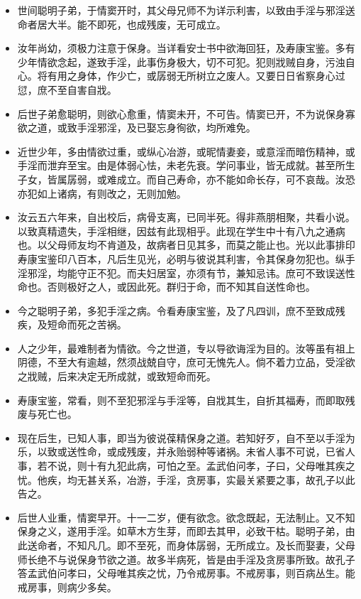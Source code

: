 \begin{itemize}\it
    \item 世间聪明子弟，于情窦开时，其父母兄师不为详示利害，以致由手淫与邪淫送命者居大半。能不即死，也成残废，无可成立。
    \item 汝年尚幼，须极力注意于保身。当详看安士书中欲海回狂，及寿康宝鉴。多有少年情欲念起，遂致手淫，此事伤身极大，切不可犯。犯则戕贼自身，污浊自心。将有用之身体，作少亡，或孱弱无所树立之废人。又要日日省察身心过愆，庶不至自害自戕。
    \item 后世子弟愈聪明，则欲心愈重，情窦未开，不可告。情窦已开，不为说保身寡欲之道，或致手淫邪淫，及已娶忘身徇欲，均所难免。
    \item 近世少年，多由情欲过重，或纵心冶游，或昵情妻妾，或意淫而暗伤精神，或手淫而泄弃至宝。由是体弱心怯，未老先衰。学问事业，皆无成就。甚至所生子女，皆属孱弱，或难成立。而自己寿命，亦不能如命长存，可不哀哉。汝恐亦犯如上诸病，有则改之，无则加勉。
    \item 汝云五六年来，自出校后，病骨支离，已同半死。得非燕朋相聚，共看小说。以致真精遗失，手淫相继，因兹有此现相乎。此现在学生中十有八九之通病也。以父母师友均不肯道及，故病者日见其多，而莫之能止也。光以此事排印寿康宝鉴印八百本，凡后生见光，必明与彼说其利害，令其保身勿犯也。纵手淫邪淫，均能守正不犯。而夫妇居室，亦须有节，兼知忌讳。庶可不致误送性命也。否则极好之人，或因此死。群归于命，而不知其自送性命也。
    \item 今之聪明子弟，多犯手淫之病。令看寿康宝鉴，及了凡四训，庶不至致成残疾，及短命而死之苦祸。
    \item 人之少年，最难制者为情欲。今之世道，专以导欲诲淫为目的。汝等虽有祖上阴德，不至大有逾越，然须战兢自守，庶可无愧先人。倘不着力立品，受淫欲之戕贼，后来决定无所成就，或致短命而死。
    \item 寿康宝鉴，常看，则不至犯邪淫与手淫等，自戕其生，自折其福寿，而即取残废与死亡也。
    \item 现在后生，已知人事，即当为彼说葆精保身之道。若知好歹，自不至以手淫为乐，以致或送性命，或成残废，并永贻弱种等诸祸。未省人事不可说，已省人事，若不说，则十有九犯此病，可怕之至。孟武伯问孝，子曰，父母唯其疾之忧。他疾，均无甚关系，冶游，手淫，贪房事，实最关紧要之事，故孔子以此告之。
    \item 后世人业重，情窦早开。十一二岁，便有欲念。欲念既起，无法制止。又不知保身之义，遂用手淫。如草木方生芽，而即去其甲，必致干枯。聪明子弟，由此送命者，不知凡几。即不至死，而身体孱弱，无所成立。及长而娶妻，父母师长绝不与说保身节欲之道。故多半病死，皆是由手淫及贪房事所致。故孔子答孟武伯问孝曰，父母唯其疾之忧，乃令戒房事。不戒房事，则百病丛生。能戒房事，则病少多矣。

\end{itemize}

